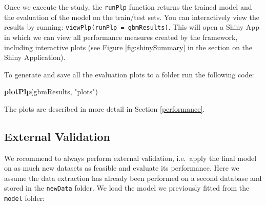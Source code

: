 \documentclass[11pt]{book}
\newenvironment{Shaded}{\begin{snugshade}}{\end{snugshade}}
\newcommand{\KeywordTok}[1]{\textcolor[rgb]{0.13,0.29,0.53}{\textbf{#1}}}
\newcommand{\StringTok}[1]{\textcolor[rgb]{0.31,0.60,0.02}{#1}}
\newcommand{\NormalTok}[1]{#1}
\theoremstyle{definition}
\theoremstyle{definition}
\theoremstyle{definition}
\theoremstyle{remark}
\begin{document}
Once we execute the study, the \texttt{runPlp} function returns the
trained model and the evaluation of the model on the train/test sets.
You can interactively view the results by running:
\texttt{viewPlp(runPlp\ =\ gbmResults)}. This will open a Shiny App in
which we can view all performance measures created by the framework,
including interactive plots (see Figure \ref{fig:shinySummary} in the
section on the Shiny Application).

To generate and save all the evaluation plots to a folder run the
following code:

\begin{Shaded}
\begin{Highlighting}[]
\KeywordTok{plotPlp}\NormalTok{(gbmResults, }\StringTok{"plots"}\NormalTok{)}
\end{Highlighting}
\end{Shaded}

The plots are described in more detail in Section \ref{performance}.

\subsection{External Validation}\label{external-validation}

We recommend to always perform external validation, i.e.~apply the final
model on as much new datasets as feasible and evaluate its performance.
Here we assume the data extraction has already been performed on a
second database and stored in the \texttt{newData} folder. We load the
model we previously fitted from the \texttt{model} folder:
\end{document}
